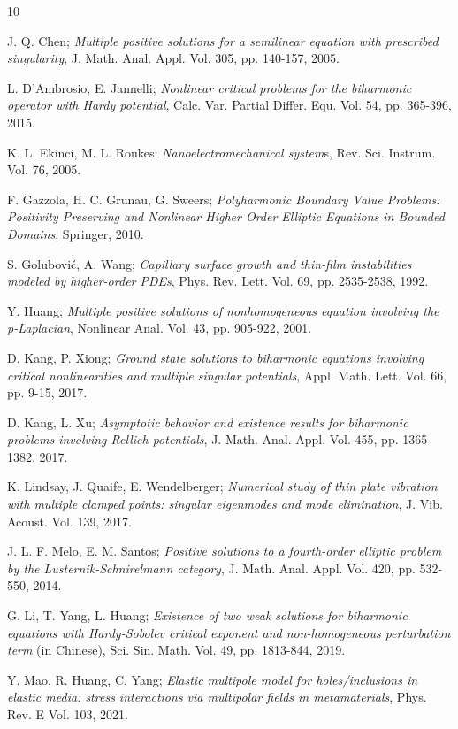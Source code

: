 \documentclass[reqno]{amsart}
\begin{document}
\begin{thebibliography}{10}

 J. Q. Chen;
\emph{Multiple positive solutions for a semilinear equation with prescribed singularity}, 
 J. Math. Anal. Appl. Vol. 305, pp. 140-157, 2005.

 L. D'Ambrosio, E. Jannelli;
\emph{Nonlinear critical problems for the biharmonic operator with Hardy potential},
 Calc. Var. Partial Differ. Equ. Vol. 54, pp. 365-396, 2015.

 K. L. Ekinci, M. L. Roukes;
\emph{Nanoelectromechanical system}s, Rev. Sci. Instrum. Vol. 76, 2005.

 F. Gazzola, H. C. Grunau, G. Sweers;
\emph{Polyharmonic Boundary Value Problems: Positivity Preserving and Nonlinear Higher 
Order Elliptic Equations in Bounded Domains}, Springer, 2010.

 S. Golubovi\'c, A. Wang;
\emph{Capillary surface growth and thin‑film instabilities modeled by higher-order 
PDEs}, Phys. Rev. Lett. Vol. 69, pp. 2535-2538, 1992.

 Y. Huang;
\emph{Multiple positive solutions of nonhomogeneous equation involving the p-Laplacian}, 
Nonlinear Anal. Vol. 43, pp. 905-922, 2001.

 D. Kang, P. Xiong;
\emph{Ground state solutions to biharmonic equations involving critical nonlinearities 
and multiple singular potentials}, Appl. Math. Lett. Vol. 66, pp. 9-15, 2017.

 D. Kang, L. Xu;
\emph{Asymptotic behavior and existence results for biharmonic problems involving 
Rellich potentials}, J. Math. Anal. Appl. Vol. 455, pp. 1365-1382, 2017.

 K. Lindsay, J. Quaife, E. Wendelberger;
\emph{Numerical study of thin plate vibration with multiple clamped points: 
singular eigenmodes and mode elimination}, J. Vib. Acoust. Vol. 139, 2017.

 J. L. F. Melo, E. M. Santos;
\emph{Positive solutions to a fourth-order elliptic problem by the Lusternik-Schnirelmann 
category}, J. Math. Anal. Appl. Vol. 420, pp. 532-550, 2014.

 G. Li, T. Yang, L. Huang;
\emph{Existence of two weak solutions for biharmonic equations with Hardy-Sobolev 
critical exponent and non-homogeneous perturbation term} (in Chinese),
 Sci. Sin. Math. Vol. 49, pp. 1813-844, 2019.

 Y. Mao, R. Huang, C. Yang;
\emph{Elastic multipole model for holes/inclusions in elastic media: stress 
interactions via multipolar fields in metamaterials}, Phys. Rev. E Vol. 103, 2021.


\end{thebibliography}
\end{document}
